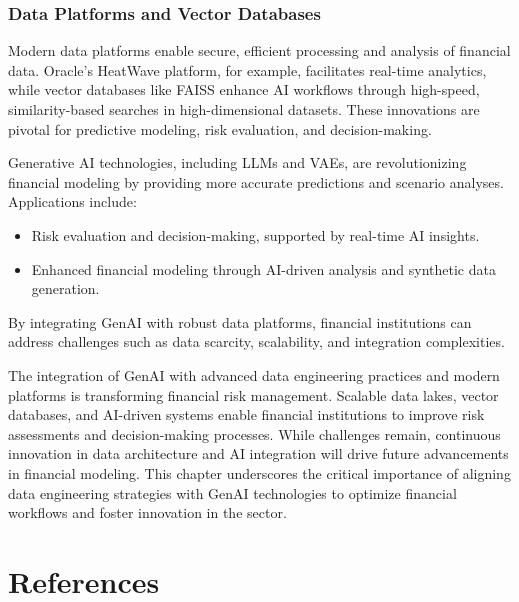 \documentclass[a4paper,12pt]{scrbook}
\begin{document}
	\subsection{Data Platforms and Vector Databases}
	Modern data platforms enable secure, efficient processing and analysis of financial data. Oracle's HeatWave platform, for example, facilitates real-time analytics, while vector databases like FAISS enhance AI workflows through high-speed, similarity-based searches in high-dimensional datasets. These innovations are pivotal for predictive modeling, risk evaluation, and decision-making.
	
	Generative AI technologies, including LLMs and VAEs, are revolutionizing financial modeling by providing more accurate predictions and scenario analyses. Applications include:
	\begin{itemize}
		\item Risk evaluation and decision-making, supported by real-time AI insights.
		\item Enhanced financial modeling through AI-driven analysis and synthetic data generation.
	\end{itemize}
	By integrating GenAI with robust data platforms, financial institutions can address challenges such as data scarcity, scalability, and integration complexities.
	
	The integration of GenAI with advanced data engineering practices and modern platforms is transforming financial risk management. Scalable data lakes, vector databases, and AI-driven systems enable financial institutions to improve risk assessments and decision-making processes. While challenges remain, continuous innovation in data architecture and AI integration will drive future advancements in financial modeling. This chapter underscores the critical importance of aligning data engineering strategies with GenAI technologies to optimize financial workflows and foster innovation in the sector.
	
	
	
	\chapter*{References}
	
\end{document}
